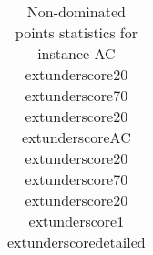 \begin{table}
\caption{Non-dominated points statistics for instance AC	extunderscore20	extunderscore70	extunderscore20	extunderscoreAC	extunderscore20	extunderscore70	extunderscore20	extunderscore1	extunderscoredetailed}
\label{tab:stats/AC_20_70_20_AC_20_70_20_1_detailed}
\begin{tabular}{}
\toprule
\midrule
\bottomrule
\end{tabular}
\end{table}
